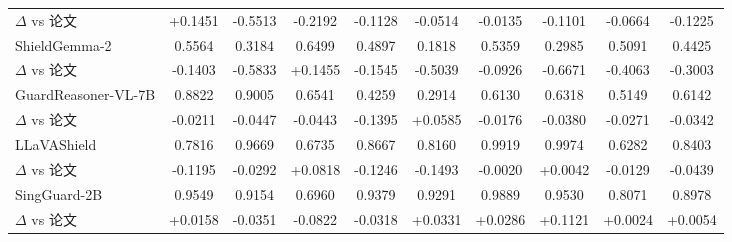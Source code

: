 \documentclass[10pt]{article}
\begin{document}
\begin{table}[t]
\begin{tabular}{lccccccccc}
\rowcolor{rowbg} \hspace{1.2em}$\Delta$ vs 论文 & \textcolor{posdelta}{+0.1451} & \textcolor{negdelta}{-0.5513} & \textcolor{negdelta}{-0.2192} & \textcolor{negdelta}{-0.1128} & \textcolor{negdelta}{-0.0514} & \textcolor{negdelta}{-0.0135} & \textcolor{negdelta}{-0.1101} & \textcolor{negdelta}{-0.0664} & \textcolor{negdelta}{-0.1225} \\
ShieldGemma-2 & 0.5564 & 0.3184 & 0.6499 & 0.4897 & 0.1818 & 0.5359 & 0.2985 & 0.5091 & 0.4425 \\
\rowcolor{rowbg} \hspace{1.2em}$\Delta$ vs 论文 & \textcolor{negdelta}{-0.1403} & \textcolor{negdelta}{-0.5833} & \textcolor{posdelta}{+0.1455} & \textcolor{negdelta}{-0.1545} & \textcolor{negdelta}{-0.5039} & \textcolor{negdelta}{-0.0926} & \textcolor{negdelta}{-0.6671} & \textcolor{negdelta}{-0.4063} & \textcolor{negdelta}{-0.3003} \\
GuardReasoner-VL-7B & 0.8822 & 0.9005 & 0.6541 & 0.4259 & 0.2914 & 0.6130 & 0.6318 & 0.5149 & 0.6142 \\
\rowcolor{rowbg} \hspace{1.2em}$\Delta$ vs 论文 & \textcolor{negdelta}{-0.0211} & \textcolor{negdelta}{-0.0447} & \textcolor{negdelta}{-0.0443} & \textcolor{negdelta}{-0.1395} & \textcolor{posdelta}{+0.0585} & \textcolor{negdelta}{-0.0176} & \textcolor{negdelta}{-0.0380} & \textcolor{negdelta}{-0.0271} & \textcolor{negdelta}{-0.0342} \\
LLaVAShield & 0.7816 & 0.9669 & 0.6735 & 0.8667 & 0.8160 & 0.9919 & 0.9974 & 0.6282 & 0.8403 \\
\rowcolor{rowbg} \hspace{1.2em}$\Delta$ vs 论文 & \textcolor{negdelta}{-0.1195} & \textcolor{negdelta}{-0.0292} & \textcolor{posdelta}{+0.0818} & \textcolor{negdelta}{-0.1246} & \textcolor{negdelta}{-0.1493} & \textcolor{negdelta}{-0.0020} & \textcolor{posdelta}{+0.0042} & \textcolor{negdelta}{-0.0129} & \textcolor{negdelta}{-0.0439} \\
SingGuard-2B & 0.9549 & 0.9154 & 0.6960 & 0.9379 & 0.9291 & 0.9889 & 0.9530 & 0.8071 & 0.8978 \\
\rowcolor{rowbg} \hspace{1.2em}$\Delta$ vs 论文 & \textcolor{posdelta}{+0.0158} & \textcolor{negdelta}{-0.0351} & \textcolor{negdelta}{-0.0822} & \textcolor{negdelta}{-0.0318} & \textcolor{posdelta}{+0.0331} & \textcolor{posdelta}{+0.0286} & \textcolor{posdelta}{+0.1121} & \textcolor{posdelta}{+0.0024} & \textcolor{posdelta}{+0.0054} \\

\end{tabular}
\end{table}
\end{document}
